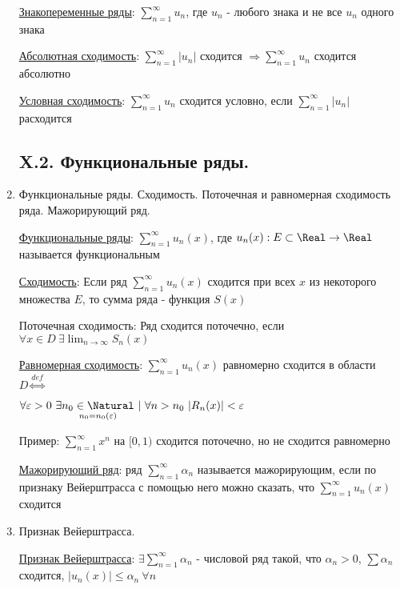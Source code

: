 \begin{enumerate}
    \hyperlink{changingsignseries}{Знакопеременные ряды}: $\sum_{n = 1}^\infty u_n$, где $u_n$ - любого знака и не все $u_n$ одного знака

    \hyperlink{absoluteconvergence}{Абсолютная сходимость}: $\sum_{n = 1}^\infty |u_n|$ сходится $\Longrightarrow \sum_{n = 1}^\infty u_n$ сходится абсолютно

    \hyperlink{conditionalconvergence}{Условная сходимость}: $\sum_{n = 1}^\infty u_n$ сходится условно, если $\sum_{n = 1}^\infty |u_n|$ расходится

\subsection{X.2. Функциональные ряды.}

    \item Функциональные ряды. Сходимость. Поточечная и равномерная сходимость ряда.
    Мажорирующий ряд.

    \hyperlink{functionalseries}{Функциональные ряды}: $\sum_{n = 1}^\infty u_n(x)$, где $u_n(x) : E \subset \Real \to \Real$ называется функциональным

    \hyperlink{functionalseriesconvergence}{Сходимость}: Если ряд $\sum_{n = 1}^\infty u_n(x)$ сходится при всех $x$ из некоторого множества $E$, то сумма ряда -
    функция $S(x)$

    Поточечная сходимость: Ряд сходится поточечно, если $\forall x \in D \ \exists \lim_{n \to \infty} S_n(x)$

    \hyperlink{uniformconvergence}{Равномерная сходимость}:  $\sum_{n = 1}^\infty u_n(x)$ равномерно сходится в области $D \overset{def}{\Longleftrightarrow}$

    $\forall \varepsilon > 0 \ \exists \underset{n_0 = n_0(\varepsilon)}{n_0 \in \Natural} \ | \ \forall n > n_0 \ |R_n(x)| < \varepsilon$

    Пример: $\sum_{n = 1}^\infty x^n$ на $[0,1)$ сходится поточечно, но не сходится равномерно

    \hyperlink{majorseries}{Мажорирующий ряд}: ряд $\sum_{n = 1}^\infty \alpha_n$ называется мажорирующим, если по 
    признаку Вейерштрасса с помощью него можно сказать, что $\sum_{n = 1}^\infty u_n(x)$ сходится

    \item Признак Вейерштрасса.

    \hyperlink{weierstrassign}{Признак Вейерштрасса}: $\exists \sum_{n = 1}^\infty \alpha_n$ - числовой ряд такой, что $\alpha_n > 0$, $\sum \alpha_n$ сходится,
    $|u_n(x)| \leq \alpha_n \ \forall n$


\end{enumerate}
